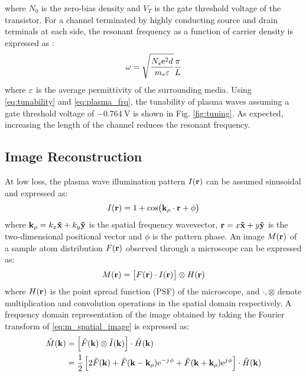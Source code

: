 \documentclass[11pt]{article}
\begin{document}
%
where $N_0$ is the zero-bias density and $V_T$ is the gate threshold voltage of the transistor. For a channel terminated by highly conducting source and drain terminals at each side, the resonant frequency as a function of carrier density is expressed as \cite{Popov2008}:
%
\begin{equation}
  \omega = \sqrt{\frac{N_s \mathrm{e}^2 d}{m_{\ast} \varepsilon}} \frac{\pi}{L}
  \label{eq:plasma_frq}
\end{equation}
%
where $\varepsilon$ is the average permittivity of the surrounding media. Using \eqref{eq:tunability} and \eqref{eq:plasma_frq}, the tunability of plasma waves assuming a gate threshold voltage of $-0.764~\mathrm{V}$ is shown in Fig. \ref{fig:tuning}. As expected, increasing the length of the channel reduces the resonant frequency.
%
%
%
\subsection{Image Reconstruction}
%
At low loss, the plasma wave illumination pattern $I(\mathbf{r})$ can be assumed sinusoidal and expressed as:
%
\begin{equation}
  I(\mathbf{r}) = 1 + \cos(\mathbf{k}_{\rho} \cdot \mathbf{r} + \phi)
  \label{eq:intensity}
\end{equation}
where $\mathbf{k}_{\rho} = k_x \mathbf{\hat{x}} + k_y \mathbf{\hat{y}}$ is the spatial frequency wavevector,  $\mathbf{r} = x \mathbf{\hat{x}} +  y \mathbf{\hat{y}}$ is the two-dimensional positional vector and $\phi$ is the pattern phase. An image $M(\mathbf{r})$ of a sample atom distribution $F(\mathbf{r})$ observed through a microscope can be expressed as:
%
\begin{equation}
  M(\mathbf{r}) = \left[ F(\mathbf{r}) \cdot I(\mathbf{r}) \right] \otimes H(\mathbf{r})
  \label{eq:m_spatial_image}
\end{equation}
%
where $H(\mathbf{r})$ is the point spread function (PSF) of the microscope, and $\cdot, \otimes$ denote multiplication and convolution operations in the spatial domain respectively. A frequency domain representation of the image obtained by taking the Fourier transform of \eqref{eq:m_spatial_image} is expressed as:
%
\begin{equation}
  \begin{split}
    \tilde{M}(\mathbf{k}) &= \left[ \tilde{F}(\mathbf{k}) \otimes \tilde{I}(\mathbf{k}) \right] \cdot \tilde{H}(\mathbf{k}) \\
     &= \frac{1}{2} \left[ 2\tilde{F}(\mathbf{k}) + \tilde{F}(\mathbf{k} - \mathbf{k}_{\rho}) \mathrm{e}^{- j\mkern1mu \phi} + \tilde{F}(\mathbf{k} + \mathbf{k}_{\rho}) \mathrm{e}^{j\mkern1mu \phi} \right] \cdot \tilde{H}(\mathbf{k})
  \end{split}
  \label{eq:m_ft}
\end{equation}
\end{document}
